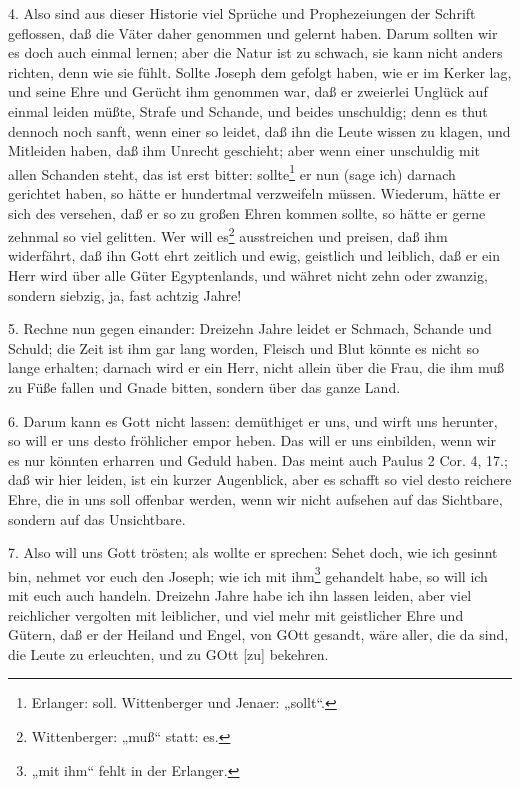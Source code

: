 4. Also sind aus dieser Historie viel Sprüche und Prophezeiungen der Schrift geflossen, daß die Väter daher genommen und gelernt haben. Darum sollten wir es doch auch einmal lernen; aber die Natur ist zu schwach, sie kann nicht anders richten, denn wie sie fühlt. Sollte Joseph dem gefolgt haben, wie er im Kerker lag, und seine Ehre und Gerücht ihm genommen war, daß er zweierlei Unglück auf einmal leiden müßte, Strafe und Schande, und beides unschuldig; denn es thut dennoch noch sanft, wenn einer so leidet, daß ihn die Leute wissen zu klagen, und Mitleiden haben, daß ihm Unrecht geschieht; aber wenn einer unschuldig mit allen Schanden steht, das ist erst bitter: sollte\footnote{Erlanger: soll. Wittenberger und Jenaer: „sollt“.} er nun (sage ich) darnach gerichtet haben, so hätte er hundertmal verzweifeln müssen. Wiederum, hätte er sich des versehen, daß er so zu großen Ehren kommen sollte, so hätte er gerne zehnmal so viel gelitten. Wer will es\footnote{Wittenberger: „muß“ statt: es.} ausstreichen und preisen, daß ihm widerfährt, daß ihn Gott ehrt zeitlich und ewig, geistlich und leiblich, daß er ein Herr wird über alle Güter Egyptenlands, und währet nicht zehn oder zwanzig, sondern siebzig, ja, fast achtzig Jahre!

5. Rechne nun gegen einander: Dreizehn Jahre leidet er Schmach, Schande und Schuld; die Zeit ist ihm gar lang worden, Fleisch und Blut könnte es nicht so lange erhalten; darnach wird er ein Herr, nicht allein über die Frau, die ihm muß zu Füße fallen und Gnade bitten, sondern über das ganze Land.

6. Darum kann es Gott nicht lassen: demüthiget er uns, und wirft uns herunter, so will er uns desto fröhlicher empor heben. Das will er uns einbilden, wenn wir es nur könnten erharren und Geduld haben. Das meint auch Paulus 2 Cor. 4, 17.; daß wir hier leiden, ist ein kurzer Augenblick, aber es schafft so viel desto reichere Ehre, die in uns soll offenbar werden, wenn wir nicht aufsehen auf das Sichtbare, sondern auf das Unsichtbare.

7. Also will uns Gott trösten; als wollte er sprechen: Sehet doch, wie ich gesinnt bin, nehmet vor euch den Joseph; wie ich mit ihm\footnote{„mit ihm“ fehlt in der Erlanger.} gehandelt habe, so will ich mit euch auch handeln. Dreizehn Jahre habe ich ihn lassen leiden, aber viel reichlicher vergolten mit leiblicher, und viel mehr mit geistlicher Ehre und Gütern, daß er
der Heiland und Engel, von GOtt gesandt, wäre aller, die da sind, die Leute zu erleuchten, und zu GOtt [zu] bekehren.

